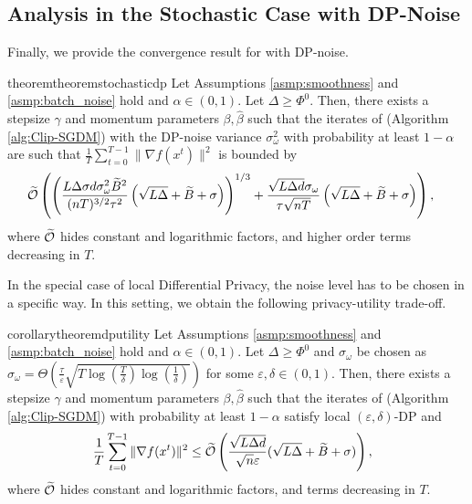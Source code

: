 \documentclass[a4paper,11pt]{article}
\begin{document}
\subsection{Analysis in the Stochastic Case with DP-Noise}

Finally, we provide the convergence result for  with DP-noise.
\begin{restatable}[]{theorem}{theoremstochasticdp}\label{th:theorem_stochastic_and_dp}
    Let Assumptions \ref{asmp:smoothness} and \ref{asmp:batch_noise} hold and $\alpha \in (0,1)$. Let $\Delta \geq \Phi^0$.
    Then, there exists a stepsize $\gamma$ and momentum parameters $\beta, \hat{\beta}$ such that the iterates of  (Algorithm \ref{alg:Clip-SGDM}) with the DP-noise variance $\sigma_{\omega}^2$  with probability at least $1-\alpha$ are such that $\frac{1}{T}\sum_{t=0}^{T-1}\|\nabla f(x^t)\|^2$ is bounded by
    \begin{align}\label{eq:theorem_stochastic_and_dp}
        & 
        \widetilde{\mathcal O}\left(\left(
        \frac{L\Delta\sigma d\sigma_{\omega}^{2}\widetilde{B}^{2}}{(nT)^{3/2}\tau^{2}} \left(\sqrt{L\Delta}
        + \widetilde{B}
        + \sigma\right)\right)^{1/3}  + 
        \frac{\sqrt{L\Delta d}\sigma_{\omega}}{\tau\sqrt{nT}}\left(\sqrt{L\Delta}+\widetilde{B} + \sigma\right)
        \right),
    \end{align}
    where $\widetilde{\mathcal O}$ hides constant and logarithmic factors, and higher order terms decreasing in $T$.
\end{restatable}

In the special case of local Differential Privacy, the noise level has to be chosen in a specific way. In this setting, we obtain the following privacy-utility trade-off.

\begin{restatable}[]{corollary}{theoremdputility}\label{cor:dp_privacy_utility_tradeoff}
    Let Assumptions \ref{asmp:smoothness} and \ref{asmp:batch_noise} hold and $\alpha\in (0,1).$ Let $\Delta \geq \Phi^0$ and $\sigma_{\omega}$ be chosen as $\sigma_{\omega} = \Theta\left(\frac{\tau}{\varepsilon}\sqrt{T\log\left(\frac{T}{\delta}\right) \log\left(\frac{1}{\delta}\right)}\right)$ for some $\varepsilon, \delta \in (0,1)$. Then, there exists a stepsize $\gamma$ and momentum parameters $\beta, \hat{\beta}$ such that the iterates of  (Algorithm \ref{alg:Clip-SGDM}) with probability at least $1-\alpha$ satisfy local $(\varepsilon,\delta)$-DP and 
     \begin{equation}
        \hspace{-8pt}\frac{1}{T}\sum_{t=0}^{T-1}\|\nabla f(x^t)\|^2 \le 
        \widetilde{\mathcal O}\left(
        \frac{\sqrt{L\Delta d}}{\sqrt{n}\varepsilon }(\sqrt{L\Delta} +  \widetilde{B} + \sigma)
        \right),
    \end{equation}
    where $\widetilde{\mathcal O}$ hides constant and logarithmic factors, and terms decreasing in $T$.
\end{restatable}
 
\end{document}
